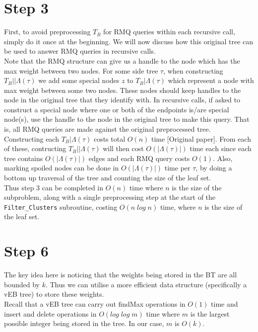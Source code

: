 \documentclass[a4paper]{article}
\begin{document}
    \section{Step 3}

    First, to avoid preprocessing $T_B$ for RMQ queries within each recursive call, simply do it once at the beginning. We will now discuss how this original tree can be used to answer RMQ queries in recursive calls.\\

    Note that the RMQ structure can give us a handle to the node which has the max weight between two nodes. For some side tree $\tau$, when constructing $T_B||\Lambda(\tau)$ we add some special nodes $z$ to $T_B|\Lambda(\tau)$ which represent a node with max weight between some two nodes. These nodes should keep handles to the node in the original tree that they identify with. In recursive calls, if asked to construct a special node where one or both of the endpoints is/are special node(s), use the handle to the node in the original tree to make this query. That is, all RMQ queries are made against the original preprocessed tree.\\

    Constructing each $T_B|\Lambda(\tau)$ costs total $O(n)$ time [Original paper]. From each of these, contructing $T_B||\Lambda(\tau)$ will then cost $O(|\Lambda(\tau)|)$ time each since each tree contains $O(|\Lambda(\tau)|)$ edges and each RMQ query costs $O(1)$. Also, marking spoiled nodes can be done in $O(|\Lambda(\tau)|)$ time per $\tau$, by doing a bottom up traversal of the tree and counting the size of the leaf set.\\

    Thus step 3 can be completed in $O(n)$ time where $n$ is the size of the subproblem, along with a single preprocessing step at the start of the \texttt{Filter\_Clusters} subroutine, costing $O(n\;log\;n)$ time, where $n$ is the size of the leaf set.

    \section{Step 6}

    The key idea here is noticing that the weights being stored in the BT are all bounded by $k$. Thus we can utilise a more efficient data structure (specifically a vEB tree) to store these weights.\\

    Recall that a vEB tree can carry out findMax operations in $O(1)$ time and insert and delete operations in $O(log\;log\;m)$ time where $m$ is the largest possible integer being stored in the tree. In our case, $m$ is $O(k)$.\\
\end{document}
